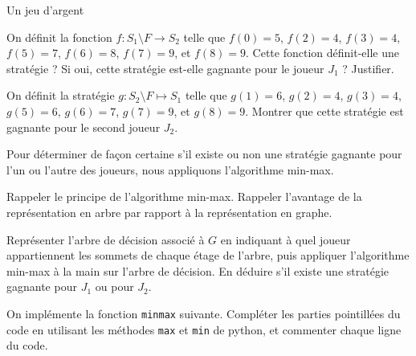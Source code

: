 \begin{exo}[PC][1][devoir]{Un jeu d'argent}
\begin{quest}
{    }
    \item 
    On définit la fonction $f : S_1\setminus F \rightarrow S_2$ telle que $f(0) = 5$, $f(2)=4$, $f(3)=4$, $f(5)=7$, $f(6)=8$, $f(7)=9$, et $f(8)=9$. Cette fonction définit-elle une stratégie ? Si oui, cette stratégie est-elle gagnante pour le joueur $J_1$ ? Justifier.  

    \item 
    On définit la stratégie $g : S_2 \setminus F \mapsto S_1$ telle que $g(1) = 6$, $g(2)=4$, $g(3)=4$, $g(5)=6$, $g(6)=7$, $g(7)=9$, et $g(8)=9$. Montrer que cette stratégie est gagnante pour le second joueur $J_2$.
  \end{quest}

  
   Pour déterminer de façon certaine s'il existe ou non une stratégie gagnante pour l'un ou l'autre des joueurs, nous appliquons l'algorithme min-max.
  \begin{quest}
    \item Rappeler le principe de l'algorithme min-max. Rappeler l'avantage de la représentation en arbre par rapport à la représentation en graphe. 
    
    \item Représenter l'arbre de décision associé à $G$ en indiquant à quel joueur appartiennent les sommets de chaque étage de l'arbre, puis appliquer l'algorithme min-max à la main sur l'arbre de décision. En déduire s'il existe une stratégie gagnante pour $J_1$ ou pour $J_2$.
    \item On implémente la fonction \texttt{minmax} suivante. Compléter les parties pointillées du code en utilisant les méthodes \texttt{max} et \texttt{min} de python, et commenter chaque ligne du code. 
    \inputminted[linenos=true,frame=single]{python}{\pathtoexos/Info/Scripts/minmax_nim.py}
    \end{quest}



\end{exo}
